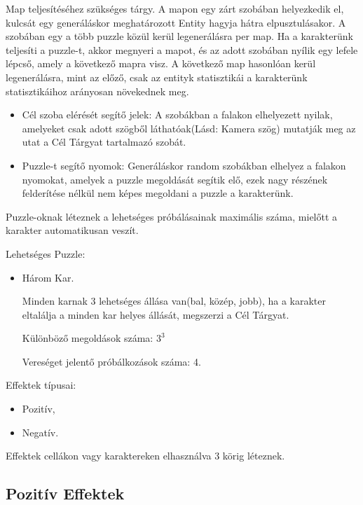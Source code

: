 
Map teljesítéséhez szükséges tárgy.
A mapon egy zárt szobában helyezkedik el, kulcsát egy generáláskor meghatározott Entity hagyja hátra elpusztulásakor.
A szobában egy a több puzzle közül kerül legenerálásra per map.
Ha a karakterünk teljesíti a puzzle-t, akkor megnyeri a mapot, és az adott szobában nyílik egy lefele lépcső, amely a következő mapra visz.
A következő map hasonlóan kerül legenerálásra, mint az előző, csak az entityk statisztikái a karakterünk statisztikáihoz arányosan növekednek meg.

\begin{itemize}
    \item Cél szoba elérését segítő jelek:
    A szobákban a falakon elhelyezett nyilak, amelyeket csak adott szögből láthatóak(Lásd: Kamera szög) mutatják meg az utat a Cél Tárgyat tartalmazó szobát.
    \item Puzzle-t segítő nyomok:
    Generáláskor random szobákban elhelyez a falakon nyomokat, amelyek a puzzle megoldását segítik elő, ezek nagy részének felderítése nélkül nem képes megoldani a puzzle a karakterünk.
\end{itemize}


Puzzle-oknak léteznek a lehetséges próbálásainak maximális száma, mielőtt a karakter automatikusan veszít.

\noindent Lehetséges Puzzle:

\begin{itemize}
    \item Három Kar.
    
    Minden karnak 3 lehetséges állása van(bal, közép, jobb), ha a karakter eltalálja a minden kar helyes állását, megszerzi a Cél Tárgyat.
    
    Különböző megoldások száma: $3^3$

    Vereséget jelentő próbálkozások száma: 4.
\end{itemize}


Effektek típusai:
\begin{itemize}
    \item Pozitív,
    \item Negatív.
\end{itemize}
Effektek cellákon vagy karaktereken elhasználva 3 körig léteznek.

\subsection{Pozitív Effektek}

